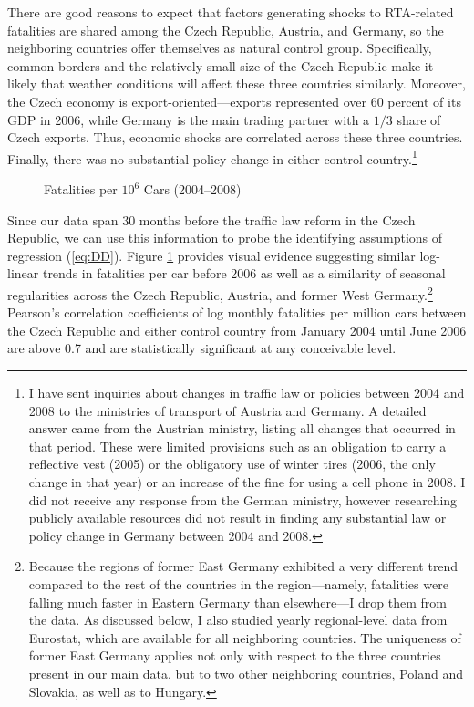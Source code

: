 \documentclass[12pt]{article}
\begin{document}
There are good reasons to expect that factors generating shocks to RTA-related
fatalities are shared among the Czech Republic, Austria, and Germany, so the
neighboring countries offer themselves as natural control group. Specifically,
common borders and the relatively small size of the Czech Republic make it
likely that weather conditions will affect these three countries similarly.
Moreover, the Czech economy is export-oriented---exports represented over 60
percent of its GDP in 2006, while Germany is the main trading partner with a
$1/3$ share of Czech exports.  Thus, economic shocks are correlated across these
three countries.  Finally, there was no substantial policy change in either
control country.\footnote{I have sent inquiries about changes in traffic law or
policies between 2004 and 2008 to the ministries of transport of Austria and
Germany. A detailed answer came from the Austrian ministry, listing all
changes that occurred in that period. These were limited provisions such as an
obligation to carry a reflective vest (2005) or the obligatory use of winter
tires (2006, the only change in that year) or an increase of the fine for
using a cell phone in 2008. I did not receive any response from the German
ministry, however researching publicly available resources did not result in
finding any substantial law or policy change in Germany between 2004 and
2008.} 

\begin{figure}[t]
\caption{Fatalities per $10^6$ Cars (2004--2008)} 
\label{fig:fatalcar}
\end{figure}

Since our data span 30 months before the traffic law reform in the Czech
Republic, we can use this information to probe the identifying assumptions of
regression (\ref{eq:DD}). Figure \ref{fig:fatalcar} provides visual evidence
suggesting similar log-linear trends in fatalities per car before 2006 as well
as a similarity of seasonal regularities across the Czech Republic, Austria, and
former West Germany.\footnote{\label{fn:DDR}Because the regions of former East
Germany exhibited a very different trend compared to the rest of the countries
in the region---namely, fatalities were falling much faster in Eastern Germany
than elsewhere---I drop them from the data. As discussed below, I also studied
yearly regional-level data from Eurostat, which are available for all
neighboring countries. The uniqueness of former East Germany applies not only
with respect to the three countries present in our main data, but to two other
neighboring countries, Poland and Slovakia, as well as to Hungary.}  Pearson's
correlation coefficients of log monthly fatalities per million cars between the
Czech Republic and either control country from January 2004 until June 2006 are
above 0.7 and are statistically significant at any conceivable level.
\end{document}
